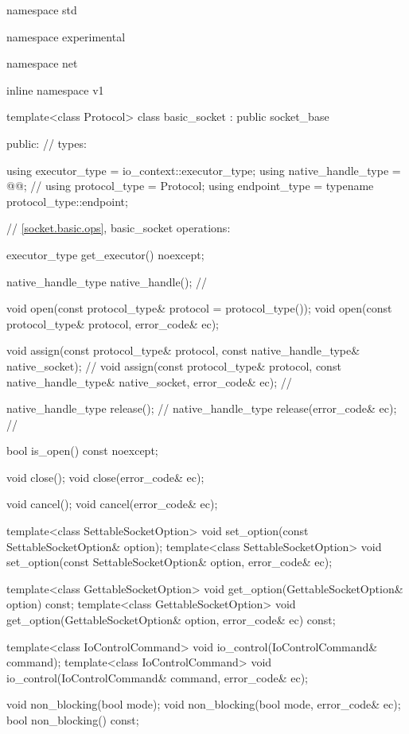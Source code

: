 \begin{codeblock}
namespace std {
namespace experimental {
namespace net {
inline namespace v1 {

  template<class Protocol>
  class basic_socket : public socket_base
  {
  public:
    // types:

    using executor_type = io_context::executor_type;
    using native_handle_type = @@; // \nativeref
    using protocol_type = Protocol;
    using endpoint_type = typename protocol_type::endpoint;

    // \ref{socket.basic.ops}, basic_socket operations:

    executor_type get_executor() noexcept;

    native_handle_type native_handle(); // \nativeref

    void open(const protocol_type& protocol = protocol_type());
    void open(const protocol_type& protocol, error_code& ec);

    void assign(const protocol_type& protocol,
                const native_handle_type& native_socket); // \nativeref
    void assign(const protocol_type& protocol,
                const native_handle_type& native_socket,
                error_code& ec); // \nativeref

    native_handle_type release(); // \nativeref
    native_handle_type release(error_code& ec); // \nativeref

    bool is_open() const noexcept;

    void close();
    void close(error_code& ec);

    void cancel();
    void cancel(error_code& ec);

    template<class SettableSocketOption>
      void set_option(const SettableSocketOption& option);
    template<class SettableSocketOption>
      void set_option(const SettableSocketOption& option, error_code& ec);

    template<class GettableSocketOption>
      void get_option(GettableSocketOption& option) const;
    template<class GettableSocketOption>
      void get_option(GettableSocketOption& option, error_code& ec) const;

    template<class IoControlCommand>
      void io_control(IoControlCommand& command);
    template<class IoControlCommand>
      void io_control(IoControlCommand& command, error_code& ec);

    void non_blocking(bool mode);
    void non_blocking(bool mode, error_code& ec);
    bool non_blocking() const;

}}}}}
\end{codeblock}

